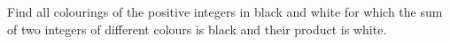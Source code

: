 Find all colourings of the positive integers in black and white for which the sum of two integers of different colours is black and their product is white.
